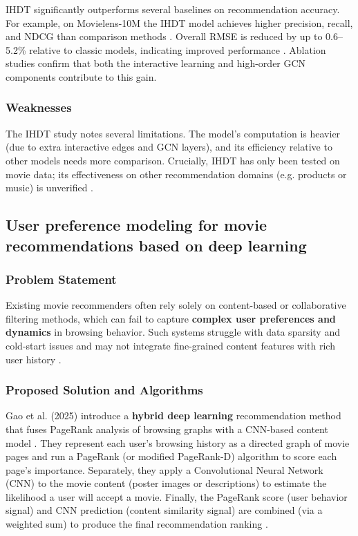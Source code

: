 IHDT significantly outperforms several baselines on recommendation accuracy. For example, on Movielens-10M the IHDT model achieves higher precision, recall, and NDCG than comparison methods \cite{he2024graph}. Overall RMSE is reduced by up to 0.6–5.2\% relative to classic models, indicating improved performance \cite{he2024graph}. Ablation studies confirm that both the interactive learning and high-order GCN components contribute to this gain.



\subsubsection{Weaknesses}

The IHDT study notes several limitations. The model’s computation is heavier (due to extra interactive edges and GCN layers), and its efficiency relative to other models needs more comparison. Crucially, IHDT has only been tested on movie data; its effectiveness on other recommendation domains (e.g. products or music) is unverified \cite{he2024graph}.



\subsection{User preference modeling for movie recommendations based on deep learning}

\subsubsection{Problem Statement}

Existing movie recommenders often rely solely on content-based or collaborative filtering methods, which can fail to capture \textbf{complex user preferences and dynamics} in browsing behavior. Such systems struggle with data sparsity and cold-start issues and may not integrate fine-grained content features with rich user history \cite{gao2025user}.



\subsubsection{Proposed Solution and Algorithms}

Gao et al. (2025) introduce a \textbf{hybrid deep learning} recommendation method that fuses PageRank analysis of browsing graphs with a CNN-based content model \cite{gao2025user}. They represent each user’s browsing history as a directed graph of movie pages and run a PageRank (or modified PageRank-D) algorithm to score each page’s importance. Separately, they apply a Convolutional Neural Network (CNN) to the movie content (poster images or descriptions) to estimate the likelihood a user will accept a movie. Finally, the PageRank score (user behavior signal) and CNN prediction (content similarity signal) are combined (via a weighted sum) to produce the final recommendation ranking \cite{gao2025user}.



